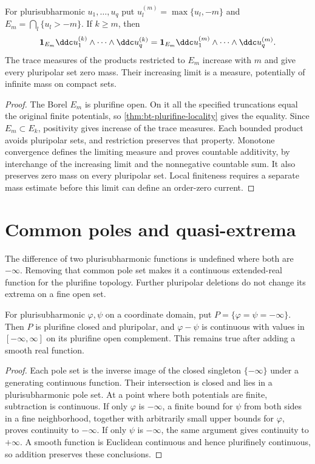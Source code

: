 \begin{proposition}\label{prop:finite-locus-truncation}
For plurisubharmonic $u_1,\ldots,u_q$ put $u_l^{(m)}=\max\{u_l,-m\}$ and $E_m=\bigcap_l\{u_l>-m\}$. If $k\ge m$, then
\[
 \mathbf1_{E_m}\ddc u_1^{(k)}\wedge\cdots\wedge\ddc u_q^{(k)}
 =\mathbf1_{E_m}\ddc u_1^{(m)}\wedge\cdots\wedge\ddc u_q^{(m)}.
\]
The trace measures of the products restricted to $E_m$ increase with $m$ and give every pluripolar set zero mass. Their increasing limit is a measure, potentially of infinite mass on compact sets.
\end{proposition}
\begin{proof}
The Borel $E_m$ is plurifine open. On it all the specified truncations equal the original finite potentials, so \cref{thm:bt-plurifine-locality} gives the equality. Since $E_m\subset E_k$, positivity gives increase of the trace measures. Each bounded product avoids pluripolar sets, and restriction preserves that property. Monotone convergence defines the limiting measure and proves countable additivity, by interchange of the increasing limit and the nonnegative countable sum. It also preserves zero mass on every pluripolar set. Local finiteness requires a separate mass estimate before this limit can define an order-zero current.
\end{proof}

\section{Common poles and quasi-extrema}
\label{sec:plurifine-quasi-extrema}

The difference of two plurisubharmonic functions is undefined where both are $-\infty$. Removing that common pole set makes it a continuous extended-real function for the plurifine topology. Further pluripolar deletions do not change its extrema on a fine open set.

\begin{proposition}\label{prop:plurifine-difference-continuity}
For plurisubharmonic $\varphi,\psi$ on a coordinate domain, put $P=\{\varphi=\psi=-\infty\}$. Then $P$ is plurifine closed and pluripolar, and $\varphi-\psi$ is continuous with values in $[-\infty,\infty]$ on its plurifine open complement. This remains true after adding a smooth real function.
\end{proposition}
\begin{proof}
Each pole set is the inverse image of the closed singleton $\{-\infty\}$ under a generating continuous function. Their intersection is closed and lies in a plurisubharmonic pole set. At a point where both potentials are finite, subtraction is continuous. If only $\varphi$ is $-\infty$, a finite bound for $\psi$ from both sides in a fine neighborhood, together with arbitrarily small upper bounds for $\varphi$, proves continuity to $-\infty$. If only $\psi$ is $-\infty$, the same argument gives continuity to $+\infty$. A smooth function is Euclidean continuous and hence plurifinely continuous, so addition preserves these conclusions.
\end{proof}

